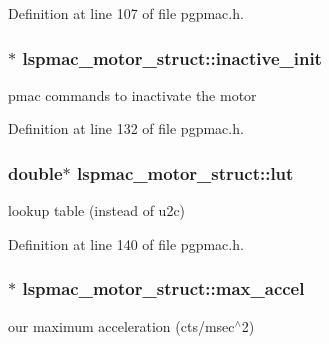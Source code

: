 Definition at line 107 of file pgpmac.\-h.

\hypertarget{structlspmac__motor__struct_ab329ce9b277eca9984c18417dece7bf7}{
\subsubsection[{inactive\-\_\-init}]{$\ast$ lspmac\-\_\-motor\-\_\-struct\-::inactive\-\_\-init}}\label{structlspmac__motor__struct_ab329ce9b277eca9984c18417dece7bf7}


pmac commands to inactivate the motor 



Definition at line 132 of file pgpmac.\-h.

\hypertarget{structlspmac__motor__struct_a7b43671f7f3e06521f6cf91fb9ac707d}{
\subsubsection[{lut}]{\setlength{\rightskip}{0pt plus 5cm}double$\ast$ lspmac\-\_\-motor\-\_\-struct\-::lut}}\label{structlspmac__motor__struct_a7b43671f7f3e06521f6cf91fb9ac707d}


lookup table (instead of u2c) 



Definition at line 140 of file pgpmac.\-h.

\hypertarget{structlspmac__motor__struct_a50cf4c0711cea164e332bc34705a1a68}{
\subsubsection[{max\-\_\-accel}]{$\ast$ lspmac\-\_\-motor\-\_\-struct\-::max\-\_\-accel}}\label{structlspmac__motor__struct_a50cf4c0711cea164e332bc34705a1a68}


our maximum acceleration (cts/msec$^\wedge$2) 



